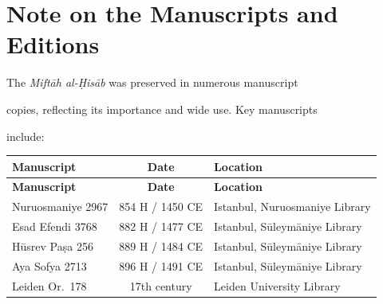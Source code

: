 \documentclass[11pt,a4paper]{article}
\begin{document}
\clearpage






\section{Note on the Manuscripts and Editions}

\label{app:manuscripts}



The \textit{Mift\=ah al-\d{H}is\=ab} was preserved in numerous manuscript

copies, reflecting its importance and wide use. Key manuscripts

include:



\begin{longtable}{|l|c|l|}

\hline

\textbf{Manuscript} & \textbf{Date} & \textbf{Location} \\

\hline

\endfirsthead

\hline

\textbf{Manuscript} & \textbf{Date} & \textbf{Location} \\

\hline

\endhead

Nuruosmaniye 2967 & 854 H / 1450 CE & Istanbul, Nuruosmaniye Library

\\

\hline

Esad Efendi 3768 & 882 H / 1477 CE & Istanbul, S\=uleym\=aniye Library \\

\hline

H\=usrev Pa\d{s}a 256 & 889 H / 1484 CE & Istanbul, S\=uleym\=aniye Library \\

\hline

Aya Sofya 2713 & 896 H / 1491 CE & Istanbul, S\=uleym\=aniye Library \\

\hline

Leiden Or.\ 178 & 17th century & Leiden University Library \\

\hline

\end{longtable}
\end{document}
